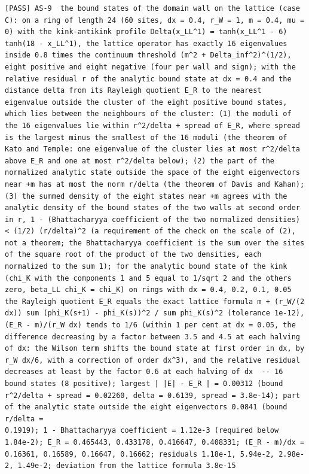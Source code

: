 \documentclass[
  10pt,
]{article}
\begin{document}
\begin{verbatim}
[PASS] AS-9  the bound states of the domain wall on the lattice (case C): on a ring of length 24 (60 sites, dx = 0.4, r_W = 1, m = 0.4, mu = 0) with the kink-antikink profile Delta(x_LL^1) = tanh(x_LL^1 - 6) tanh(18 - x_LL^1), the lattice operator has exactly 16 eigenvalues inside 0.8 times the continuum threshold (m^2 + Delta_inf^2)^(1/2), eight positive and eight negative (four per wall and sign); with the relative residual r of the analytic bound state at dx = 0.4 and the distance delta from its Rayleigh quotient E_R to the nearest eigenvalue outside the cluster of the eight positive bound states, which lies between the neighbours of the cluster: (1) the moduli of the 16 eigenvalues lie within r^2/delta + spread of E_R, where spread is the largest minus the smallest of the 16 moduli (the theorem of Kato and Temple: one eigenvalue of the cluster lies at most r^2/delta above E_R and one at most r^2/delta below); (2) the part of the normalized analytic state outside the space of the eight eigenvectors near +m has at most the norm r/delta (the theorem of Davis and Kahan); (3) the summed density of the eight states near +m agrees with the analytic density of the bound states of the two walls at second order in r, 1 - (Bhattacharyya coefficient of the two normalized densities) < (1/2) (r/delta)^2 (a requirement of the check on the scale of (2), not a theorem; the Bhattacharyya coefficient is the sum over the sites of the square root of the product of the two densities, each normalized to the sum 1); for the analytic bound state of the kink (chi_K with the components 1 and 5 equal to 1/sqrt 2 and the others zero, beta_LL chi_K = chi_K) on rings with dx = 0.4, 0.2, 0.1, 0.05 the Rayleigh quotient E_R equals the exact lattice formula m + (r_W/(2 dx)) sum (phi_K(s+1) - phi_K(s))^2 / sum phi_K(s)^2 (tolerance 1e-12), (E_R - m)/(r_W dx) tends to 1/6 (within 1 per cent at dx = 0.05, the difference decreasing by a factor between 3.5 and 4.5 at each halving of dx: the Wilson term shifts the bound state at first order in dx, by r_W dx/6, with a correction of order dx^3), and the relative residual decreases at least by the factor 0.6 at each halving of dx  -- 16 bound states (8 positive); largest | |E| - E_R | = 0.00312 (bound r^2/delta + spread = 0.02260, delta = 0.6139, spread = 3.8e-14); part of the analytic state outside the eight eigenvectors 0.0841 (bound r/delta =
0.1919); 1 - Bhattacharyya coefficient = 1.12e-3 (required below 1.84e-2); E_R = 0.465443, 0.433178, 0.416647, 0.408331; (E_R - m)/dx = 0.16361, 0.16589, 0.16647, 0.16662; residuals 1.18e-1, 5.94e-2, 2.98e-2, 1.49e-2; deviation from the lattice formula 3.8e-15

\end{verbatim}
\end{document}
